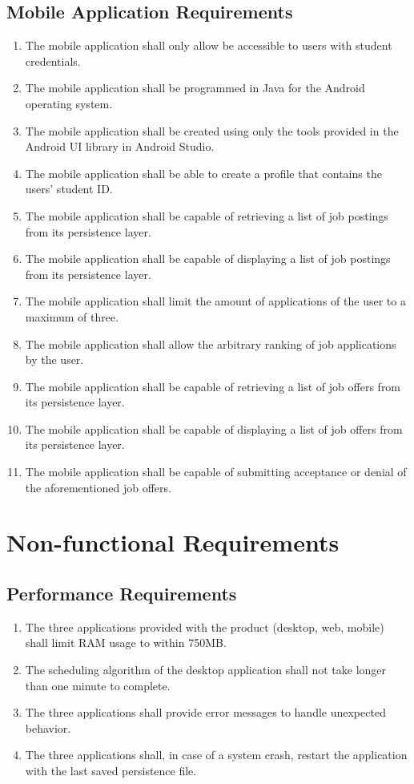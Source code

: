 \documentclass[12pt]{report}
\begin{document}
\subsection{Mobile Application Requirements}
\begin{enumerate}[\thesubsection .1]
	\item The mobile application shall only allow be accessible to users with student credentials.
	\item The mobile application shall be programmed in Java for the Android operating system.
	\item The mobile application shall be created using only the tools provided in the Android UI library in Android Studio.
	\item The mobile application shall be able to create a profile that contains the users' student ID.
	\item The mobile application shall be capable of retrieving a list of job postings from its persistence layer.
	\item The mobile application shall be capable of displaying a list of job postings from its persistence layer.
	\item The mobile application shall limit the amount of applications of the user to a maximum of three.
	\item The mobile application shall allow the arbitrary ranking of job applications by the user.
	\item The mobile application shall be capable of retrieving a list of job offers from its persistence layer.
	\item The mobile application shall be capable of displaying a list of job offers from its persistence layer.
	\item The mobile application shall be capable of submitting acceptance or denial of the aforementioned job offers.
\end{enumerate}

\section{Non-functional Requirements}
\subsection{Performance Requirements}
\begin{enumerate}[\thesubsection .1]
	\item The three applications provided with the product (desktop, web, mobile) shall limit RAM usage to within 750MB.
	\item The scheduling algorithm of the desktop application shall not take longer than one minute to complete.
	\item The three applications shall provide error messages to handle unexpected behavior.
	\item The three applications shall, in case of a system crash, restart the application with the last saved persistence file.
\end{enumerate}
\end{document}
